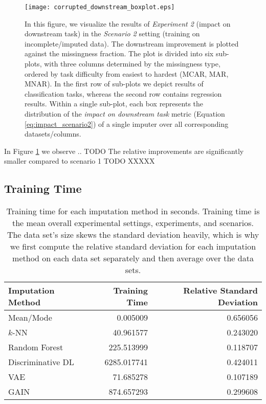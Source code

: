 \begin{figure}\centering
	\texttt{[image: corrupted\_downstream\_boxplot.eps]}

	\caption[Downstream Ranks - Corrupted]{In this figure, we visualize the results of \textit{Experiment 2} (impact on downstream task) in the \textit{Scenario 2} setting (training on incomplete/imputed data). The downstream improvement is plotted against the missingness fraction. The plot is divided into six sub-plots, with three columns determined by the missingness type, ordered by task difficulty from easiest to hardest (MCAR, MAR, MNAR). In the first row of sub-plots we depict results of classification tasks, whereas the second row contains regression results. Within a single sub-plot, each box represents the distribution of the \textit{impact on downstream task} metric (Equation \ref{eq:impact_scenario2}) of a single imputer over all corresponding datasets/columns.
    }
	\label{fig:corrupted_downstream_boxplot}
\end{figure}

In Figure \ref{fig:corrupted_downstream_boxplot} we observe .. TODO
The relative improvements are significantly smaller compared to scenario 1
TODO XXXXX




\subsection{Training Time}

\begin{table}
	\centering
	\label{tab:time}
	\begin{tabular}{lrr}
		\toprule
		Imputation Method &  Training Time &  Relative Standard Deviation \\
		\midrule
		Mean/Mode &       0.005009 &                     0.656056 \\
		$k$-NN &      40.961577 &                     0.243020 \\
		Random Forest &     225.513999 &                     0.118707 \\
		Discriminative DL &    6285.017741 &                     0.424011 \\
		VAE &      71.685278 &                     0.107189 \\
		GAIN &     874.657293 &                     0.299608 \\
		\bottomrule
	\end{tabular}
	\caption{Training time for each imputation method in seconds. Training time is the mean overall experimental settings, experiments, and scenarios. The data set's size skews the standard deviation heavily, which is why we first compute the relative standard deviation for each imputation method on each data set separately and then average over the data sets.}
\end{table}
